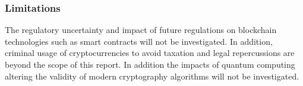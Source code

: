 \subsubsection{Limitations}

The regulatory uncertainty and impact of future regulations on blockchain technologies such as smart contracts will not be investigated. In addition, criminal usage of cryptocurrencies to avoid taxation and legal repercussions are beyond the scope of this report. In addition the impacts of quantum computing altering the validity of modern cryptography algorithms will not be investigated.

\newpage  
